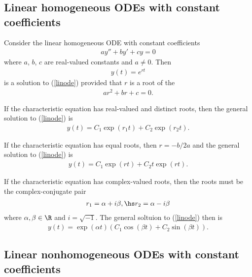 \documentclass{article}
\begin{document}
\subsection{Linear homogeneous ODEs with constant coefficients}

\begin{theorem}
Consider the linear homogeneous ODE with constant coefficients
\begin{align}
    \label{linode}
    ay'' + by' + cy = 0
\end{align}
where $a$, $b$, $c$ are real-valued constants and $a\not=0$.
Then 
\begin{align*}
    y(t)=e^{rt}
\end{align*}
is a solution to (\ref{linode}) provided that $r$ is a root of the
\begin{align*}
    ar^2 + br + c = 0.
\end{align*}
\end{theorem}
\begin{theorem}
    If the characteristic equation has real-valued and distinct roots,
    then the general solution to (\ref{linode}) is
    \begin{align*}
        y(t)=C_1\exp(r_1 t) + C_2 \exp(r_2 t).
    \end{align*}
\end{theorem}
\begin{theorem}
    If the characteristic equation has equal roots, then $r=-b/2a$ and the
    general solution to (\ref{linode}) is
    \begin{align*}
        y(t)=C_1\exp\left(rt\right)+C_2t\exp(rt).
    \end{align*}
\end{theorem}
\begin{theorem}
    If the characteristic equation has complex-valued roots, then the
    roots must be the complex-conjugate pair
    \begin{align*}
        r_1 = \alpha + i\beta,\hs r_2 = \alpha - i\beta
    \end{align*}
    where $\alpha,\beta\in\R$ and $i=\sqrt{-1}$. The general soltuion
    to (\ref{linode}) then is
    \begin{align*}
        y(t) = \exp(\alpha t)\left(C_1 \cos\left(\beta t\right)+C_2\sin\left(\beta t\right)\right).
    \end{align*}
\end{theorem}


\subsection{Linear nonhomogeneous ODEs with constant coefficients}
\end{document}
